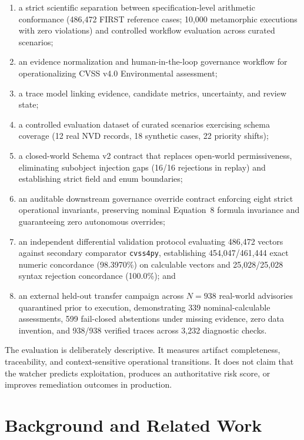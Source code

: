 \documentclass[conference]{IEEEtran}
\begin{document}
\begin{enumerate}
\item a strict scientific separation between specification-level arithmetic
conformance (486,472 FIRST reference cases; 10,000 metamorphic executions with
zero violations) and controlled workflow evaluation across curated scenarios;
\item an evidence normalization and human-in-the-loop governance workflow for operationalizing CVSS v4.0
Environmental assessment;
\item a trace model linking evidence, candidate metrics, uncertainty, and
review state;
\item a controlled evaluation dataset of curated scenarios exercising schema coverage (12 real NVD records, 18 synthetic cases, 22 priority shifts);
\item a closed-world Schema v2 contract that replaces open-world permissiveness, eliminating subobject injection gaps (16/16 rejections in replay) and establishing strict field and enum boundaries;
\item an auditable downstream governance override contract enforcing eight strict operational invariants, preserving nominal Equation~8 formula invariance and guaranteeing zero autonomous overrides;
\item an independent differential validation protocol evaluating 486,472 vectors against secondary comparator \texttt{cvss4py}, establishing 454,047/461,444 exact numeric concordance (98.3970\%) on calculable vectors and 25,028/25,028 syntax rejection concordance (100.0\%); and
\item an external held-out transfer campaign across $N=938$ real-world advisories quarantined prior to execution, demonstrating 339 nominal-calculable assessments, 599 fail-closed abstentions under missing evidence, zero data invention, and 938/938 verified traces across 3,232 diagnostic checks.
\end{enumerate}

The evaluation is deliberately descriptive. It measures artifact completeness,
traceability, and context-sensitive operational transitions. It does not claim
that the watcher predicts exploitation, produces an authoritative risk score,
or improves remediation outcomes in production.

\section{Background and Related Work}
\end{document}
